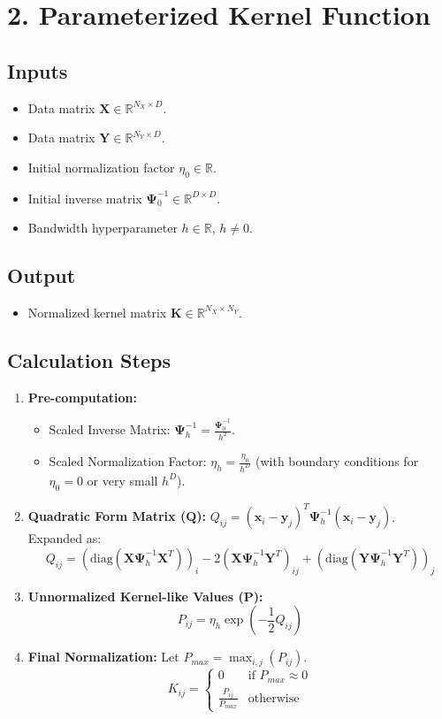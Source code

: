 \documentclass{article}
\newcommand{\mat}[1]{\mathbf{#1}} %
\newcommand{\vecbf}[1]{\bm{#1}} %
\begin{document}
\section*{2. Parameterized Kernel Function}
\subsection*{Inputs}
\begin{itemize}
    \item Data matrix $\mat{X} \in \mathbb{R}^{N_X \times D}$.
    \item Data matrix $\mat{Y} \in \mathbb{R}^{N_Y \times D}$.
    \item Initial normalization factor $\eta_0 \in \mathbb{R}$.
    \item Initial inverse matrix $\mat{\Psi}^{-1}_0 \in \mathbb{R}^{D \times D}$.
    \item Bandwidth hyperparameter $h \in \mathbb{R}$, $h \neq 0$.
\end{itemize}
\subsection*{Output}
\begin{itemize}
    \item Normalized kernel matrix $\mat{K} \in \mathbb{R}^{N_X \times N_Y}$.
\end{itemize}

\subsection*{Calculation Steps}
\begin{enumerate}
    \item \textbf{Pre-computation:}
    \begin{itemize}
        \item Scaled Inverse Matrix: $\mat{\Psi}^{-1}_h = \frac{\mat{\Psi}^{-1}_0}{h^2}$.
        \item Scaled Normalization Factor: $\eta_h = \frac{\eta_0}{h^D}$ (with boundary conditions for $\eta_0=0$ or very small $h^D$).
    \end{itemize}
    \item \textbf{Quadratic Form Matrix ($\mat{Q}$):} $Q_{ij} = (\vecbf{x}_i - \vecbf{y}_j)^T \mat{\Psi}^{-1}_h (\vecbf{x}_i - \vecbf{y}_j)$.
    Expanded as:
    $$ Q_{ij} = (\text{diag}(\mat{X} \mat{\Psi}^{-1}_h \mat{X}^T))_i - 2 (\mat{X} \mat{\Psi}^{-1}_h \mat{Y}^T)_{ij} + (\text{diag}(\mat{Y} \mat{\Psi}^{-1}_h \mat{Y}^T))_j $$
    \item \textbf{Unnormalized Kernel-like Values ($\mat{P}$):}
    $$ P_{ij} = \eta_h \exp\left(-\frac{1}{2} Q_{ij}\right) $$
    \item \textbf{Final Normalization:}
    Let $P_{max} = \max_{i,j} (P_{ij})$.
    $$ K_{ij} = \begin{cases} 0 & \text{if } P_{max} \approx 0 \\ \frac{P_{ij}}{P_{max}} & \text{otherwise} \end{cases} $$
\end{enumerate}
\end{document}
